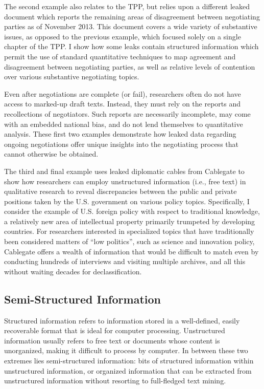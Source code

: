 \documentclass[12pt]{article}
\begin{document}
The second example also relates to the TPP, but relies upon a different leaked document which reports  
the remaining areas of disagreement between negotiating parties as of November 2013. This document  
covers a wide variety of substantive issues, as opposed to the previous example, which focused solely 
on a single chapter of the TPP. I show how some leaks contain structured information which 
permit the use of standard quantitative techniques to map agreement and disagreement between negotiating 
parties, as well as relative levels of contention over various substantive negotiating topics. 

Even after negotiations are complete (or fail), researchers often do not have 
access to marked-up draft texts. Instead, they must rely on the reports and recollections of negotiators.  
Such reports are necessarily incomplete, may come with an embedded national bias, and do not lend themselves 
to quantitative analysis. These first two examples demonstrate how leaked data regarding ongoing negotiations 
offer unique insights into the negotiating process that cannot otherwise be obtained. 

The third and final example uses leaked diplomatic cables from Cablegate to show how researchers can employ 
unstructured information (i.e., free text) in qualitative research to reveal discrepancies between the 
public and private positions taken by the U.S. government on various policy topics. Specifically, I consider 
the example of U.S. foreign policy with respect to traditional knowledge, a relatively new area of intellectual 
property primarily trumpeted by developing countries. For researchers interested in specialized topics 
that have traditionally been considered matters of ``low politics'', such as science and innovation policy, 
Cablegate offers a wealth of information that would be difficult to match even by conducting hundreds of 
interviews and visiting multiple archives, and all this without waiting decades for declassification.

\subsection{Semi-Structured Information}

Structured information refers to information stored in a well-defined, easily recoverable format that 
is ideal for computer processing. Unstructured information usually refers to free text or documents 
whose content is unorganized, making it difficult to process by computer. In between these two extremes 
lies semi-structured information: bits of structured information within unstructured information, 
or organized information that can be extracted from unstructured information without resorting to 
full-fledged text mining.
\end{document}
